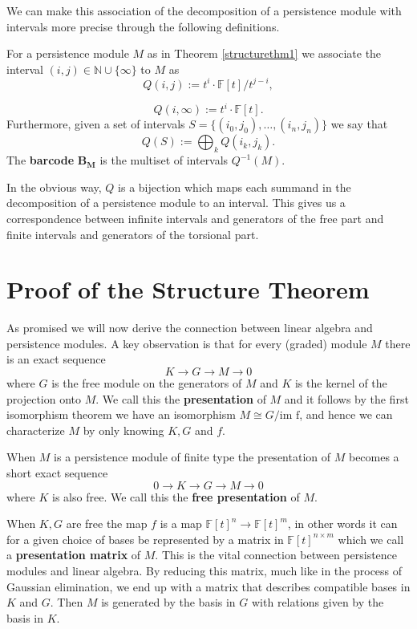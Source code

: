 We can make this association of the decomposition of a persistence module with intervals more precise through the following definitions.

\begin{definition}
  For a persistence module $M$ as in Theorem \ref{structurethm1} we associate the interval $(i,j) \in \mathbb{N}\cup \{\infty\}$ to ${M}$ as
  \[Q(i,j):= t^{i} \cdot \mathbb{F}[t]/t^{{j-i}},\]

  \[Q(i,\infty):= t^{i} \cdot \mathbb{F}[t].\]
  Furthermore, given a set of intervals $S = \{(i_{0},j_{0}),\dots,(i_{n},j_{n})\}$ we say that
  \[Q(S) := \bigoplus_{k} Q(i_{k},j_{k}).\]
  The \textbf{barcode} $\mathbf{B_{M}}$ is the multiset of intervals $Q^{-1}(M)$.
\end{definition}


In the obvious way, $Q$ is a bijection which maps each summand in the decomposition of a persistence module to an interval. This gives us a correspondence between infinite intervals and generators of the free part and finite intervals and generators of the torsional part.


\section{Proof of the Structure Theorem}
As promised we will now derive the connection between linear algebra and persistence modules. A key observation is that for every (graded) module $M$ there is an exact sequence
\[ K \to G \to M \to 0\]
where $G$ is the free module on the generators of $M$ and $K$ is the kernel of the projection onto $M$. We call this the \textbf{presentation} of $M$ and it follows by the first isomorphism theorem we have an isomorphism $M \cong G/\text{im f}$, and hence we can characterize $M$ by only knowing $K,G$ and $f$.
\begin{lemma}
  When $M$ is a persistence module of finite type the presentation of $M$ becomes a short exact sequence
  \[ 0 \to K \to G \to M \to 0\]
  where $K$ is also free. We call this the \textbf{free presentation} of $M$.
\end{lemma}
When $K,G$ are free the map $f$ is a map $\mathbb{F}[t]^{n} \to \mathbb{F}[t]^{m}$, in other words it can for a given choice of bases be represented by a matrix in $\mathbb{F}[t]^{n \times m}$ which we call a \textbf{presentation matrix} of $M$. This is the vital connection between persistence modules and linear algebra. By reducing this matrix, much like in the process of Gaussian elimination, we end up with a matrix that describes compatible bases in $K$ and $G$. Then $M$ is generated by the basis in $G$ with relations given by the basis in $K$.

